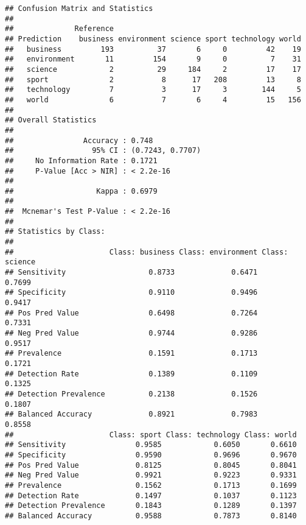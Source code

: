 \documentclass[]{article}
\begin{document}
\begin{verbatim}
## Confusion Matrix and Statistics
## 
##              Reference
## Prediction    business environment science sport technology world
##   business         193          37       6     0         42    19
##   environment       11         154       9     0          7    31
##   science            2          29     184     2         17    17
##   sport              2           8      17   208         13     8
##   technology         7           3      17     3        144     5
##   world              6           7       6     4         15   156
## 
## Overall Statistics
##                                           
##                Accuracy : 0.748           
##                  95% CI : (0.7243, 0.7707)
##     No Information Rate : 0.1721          
##     P-Value [Acc > NIR] : < 2.2e-16       
##                                           
##                   Kappa : 0.6979          
##                                           
##  Mcnemar's Test P-Value : < 2.2e-16       
## 
## Statistics by Class:
## 
##                      Class: business Class: environment Class: science
## Sensitivity                   0.8733             0.6471         0.7699
## Specificity                   0.9110             0.9496         0.9417
## Pos Pred Value                0.6498             0.7264         0.7331
## Neg Pred Value                0.9744             0.9286         0.9517
## Prevalence                    0.1591             0.1713         0.1721
## Detection Rate                0.1389             0.1109         0.1325
## Detection Prevalence          0.2138             0.1526         0.1807
## Balanced Accuracy             0.8921             0.7983         0.8558
##                      Class: sport Class: technology Class: world
## Sensitivity                0.9585            0.6050       0.6610
## Specificity                0.9590            0.9696       0.9670
## Pos Pred Value             0.8125            0.8045       0.8041
## Neg Pred Value             0.9921            0.9223       0.9331
## Prevalence                 0.1562            0.1713       0.1699
## Detection Rate             0.1497            0.1037       0.1123
## Detection Prevalence       0.1843            0.1289       0.1397
## Balanced Accuracy          0.9588            0.7873       0.8140
\end{verbatim}
\end{document}
